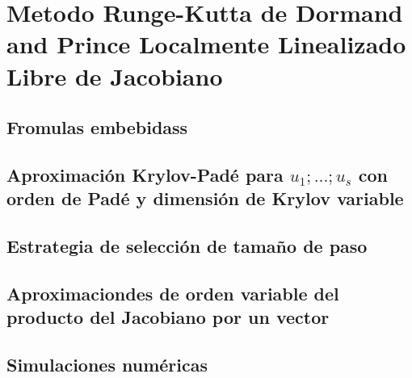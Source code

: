 \chapter{Metodo Runge-Kutta de Dormand and Prince Localmente Linealizado Libre de
Jacobiano}\label{chapter:lldp-fj}

\section{Fromulas embebidass}

\section{Aproximación Krylov-Padé para ${u_1;\ldots;u_s}$ con orden de Padé y dimensión de Krylov variable}

\section{Estrategia de selección de tamaño de paso}

\section{Aproximaciondes de orden variable del producto del Jacobiano por un vector}

\section{Simulaciones numéricas}